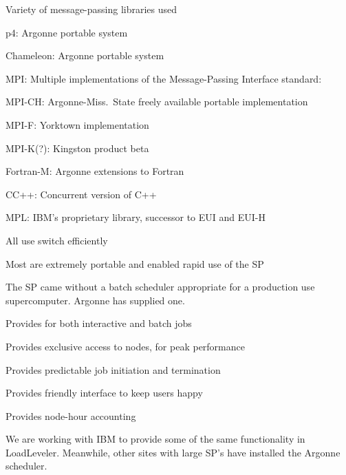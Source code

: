 \begin{small}
Variety of message-passing libraries used
\begin{mainpts}
  \item p4:  Argonne portable system
  \item Chameleon:  Argonne portable system
  \item MPI:  Multiple implementations of the Message-Passing Interface
    standard: 
    \begin{secpts}
      \item MPI-CH:  Argonne-Miss.~State freely available portable
implementation 
      \item MPI-F:  Yorktown implementation
      \item MPI-K(?):  Kingston product beta
    \end{secpts}
  \item Fortran-M:  Argonne extensions to Fortran
  \item CC++:  Concurrent version of C++
  \item MPL:  IBM's proprietary library, successor to EUI and EUI-H
\end{mainpts}
All use switch efficiently

Most are extremely portable and enabled rapid use of the SP
\end{small}
\ve

\begin{small}
The SP came without a batch scheduler appropriate for a production use
supercomputer.  Argonne has supplied one.
\begin{mainpts}
  \item Provides for both interactive and batch jobs
  \item Provides exclusive access to nodes, for peak performance
  \item Provides predictable job initiation and termination
  \item Provides friendly interface to keep users happy
  \item Provides node-hour accounting
\end{mainpts}
We are working with IBM to provide some of the same functionality in
LoadLeveler.  Meanwhile, other sites with large SP's have installed the
Argonne scheduler.

\end{small}
\ve

